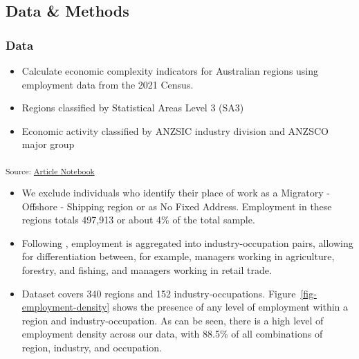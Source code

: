 \documentclass[
  number]{elsarticle}
\begin{document}
\subsection{Data \& Methods}\label{sec-data-methods}

\subsubsection{Data}\label{data}

\begin{itemize}
\item
  Calculate economic complexity indicators for Australian regions using
  employment data from the 2021 Census.
\item
  Regions classified by Statistical Areas Level 3 (SA3)
\item
  Economic activity classified by ANZSIC industry division and ANZSCO
  major group
\end{itemize}

\textsubscript{Source:
\href{https://aiti-flinders.github.io/sirp-complexity/index.qmd.html}{Article
Notebook}}

\begin{itemize}
\item
  We exclude individuals who identify their place of work as a Migratory
  - Offshore - Shipping region or as No Fixed Address. Employment in
  these regions totals 497,913 or about 4\% of the total sample.
\item
  Following \citep{ecnz}, employment is aggregated into
  industry-occupation pairs, allowing for differentiation between, for
  example, managers working in agriculture, forestry, and fishing, and
  managers working in retail trade.
\item
  Dataset covers 340 regions and 152 industry-occupations.
  Figure~\ref{fig-employment-density} shows the presence of any level of
  employment within a region and industry-occupation. As can be seen,
  there is a high level of employment density across our data, with
  88.5\% of all combinations of region, industry, and occupation.
\end{itemize}
\end{document}
